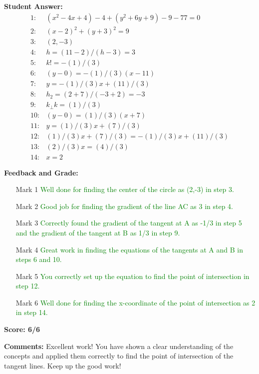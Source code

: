 \documentclass{article}
\begin{document}
\textbf{Student Answer:}
\begin{align*}
1: & (x^{2}-4x+4)-4+(y^{2}+6y+9)-9-77=0 \\
2: & (x-2)^{2}+(y+3)^{2}=9 \\
3: & (2,-3) \\
4: & h=(11-2)/(h-3)=3 \\
5: & k!=-(1)/(3) \\
6: & (y-0)=-(1)/(3)(x-11) \\
7: & y=-(1)/(3)x+(11)/(3) \\
8: & h_2=(2+7)/(-3+2)=-3 \\
9: & k_\perp k=(1)/(3) \\
10: & (y-0)=(1)/(3)(x+7) \\
11: & y=(1)/(3)x+(7)/(3) \\
12: & (1)/(3)x+(7)/(3)=-(1)/(3)x+(11)/(3) \\
13: & (2)/(3)x=(4)/(3) \\
14: & x=2
\end{align*}

\textbf{Feedback and Grade:}
\begin{itemize}
\item[Mark 1] \textcolor{green}{Well done for finding the center of the circle as (2,-3) in step 3.}
\item[Mark 2] \textcolor{green}{Good job for finding the gradient of the line AC as 3 in step 4.}
\item[Mark 3] \textcolor{green}{Correctly found the gradient of the tangent at A as -1/3 in step 5 and the gradient of the tangent at B as 1/3 in step 9.}
\item[Mark 4] \textcolor{green}{Great work in finding the equations of the tangents at A and B in steps 6 and 10.}
\item[Mark 5] \textcolor{green}{You correctly set up the equation to find the point of intersection in step 12.}
\item[Mark 6] \textcolor{green}{Well done for finding the x-coordinate of the point of intersection as 2 in step 14.}
\end{itemize}

\textbf{Score: 6/6}

\textbf{Comments:} Excellent work! You have shown a clear understanding of the concepts and applied them correctly to find the point of intersection of the tangent lines. Keep up the good work!
\end{document}
